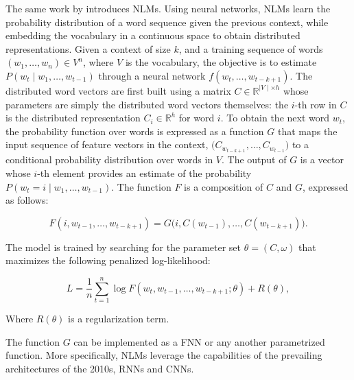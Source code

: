 
The same work by \citet{bengio2000neural} introduces \acp{NLM}. Using neural networks, \acp{NLM} learn the probability distribution of a word sequence given the previous context, while embedding the vocabulary in a continuous space to obtain distributed representations. Given a context of size $k$, and a training sequence of words $(w_1, \ldots, w_n) \in V^n$, where $V$ is the vocabulary, the objective is to estimate $P(w_t \mid w_1, \ldots, w_{t-1})$ through a neural network $f(w_t, \ldots, w_{t-k+1})$. The distributed word vectors are first built using a matrix $C \in \mathbb{R}^{\mid V \mid \times h}$ whose parameters are simply the distributed word vectors themselves: the $i$-th row in $C$ is the distributed representation $C_i \in \mathbb{R}^h$ for word $i$. To obtain the next word $w_t$, the probability function over words is expressed as a function $G$ that maps the input sequence of feature vectors in the context, $\bigl(C_{w_{t-k+1}}, \ldots, C_{w_{t-1}}\bigr)$ to a conditional probability distribution over words in $V$. The output of $G$ is a vector whose $i$-th element provides an estimate of the probability $P(w_t = i \mid w_1, \ldots, w_{t-1})$. The function $F$ is a composition of $C$ and $G$, expressed as follows:

\begin{equation}
    F(i, w_{t-1}, \ldots, w_{t-k+1}) = G\bigl(i, C(w_{t-1}), \ldots, C(w_{t-k+1})\bigr).
\label{eq:chapter2-bengio}
\end{equation}

The model is trained by searching for the parameter set $\theta = (C, \omega)$ that maximizes the following penalized log-likelihood:

\begin{equation}
    L = \frac{1}{n} \sum_{t=1}^n \log F(w_t, w_{t-1}, \ldots, w_{t-k+1}; \theta) + R(\theta),
\label{eq:chapter2-nlm-log-likelihood}
\end{equation}

\noindent Where $R(\theta)$ is a regularization term.

The function $G$ can be implemented as a \ac{FNN} or any another parametrized function. More specifically, \acp{NLM} leverage the capabilities of the prevailing architectures of the 2010s, \acp{RNN} and \acp{CNN}.


